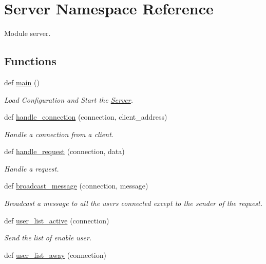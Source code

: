 \hypertarget{namespace_server}{}\section{Server Namespace Reference}
\label{namespace_server}


Module server.  


\subsection*{Functions}
\begin{DoxyCompactItemize}
\item 
def \hyperlink{namespace_server_a3b6f7f7679d98f214467d05da4618a0c}{main} ()
\begin{DoxyCompactList}\small\item\em Load Configuration and Start the \hyperlink{namespace_server}{Server}. \end{DoxyCompactList}\item 
def \hyperlink{namespace_server_a5956f54107dc04f2c1700fcf62f1afc9}{handle\+\_\+connection} (connection, client\+\_\+address)
\begin{DoxyCompactList}\small\item\em Handle a connection from a client. \end{DoxyCompactList}\item 
def \hyperlink{namespace_server_a8965f4e84689d4e2b198091f0383fd41}{handle\+\_\+request} (connection, data)
\begin{DoxyCompactList}\small\item\em Handle a request. \end{DoxyCompactList}\item 
def \hyperlink{namespace_server_a5b7286b84051e8f089e78cec5276027f}{broadcast\+\_\+message} (connection, message)
\begin{DoxyCompactList}\small\item\em Broadcast a message to all the users connected except to the sender of the request. \end{DoxyCompactList}\item 
def \hyperlink{namespace_server_a79e61c36bfba574632384d7c95f687e8}{user\+\_\+list\+\_\+active} (connection)
\begin{DoxyCompactList}\small\item\em Send the list of enable user. \end{DoxyCompactList}\item 
def \hyperlink{namespace_server_a616374a08f1e1cd1c4fa745e10af349a}{user\+\_\+list\+\_\+away} (connection)

\end{DoxyCompactItemize}
